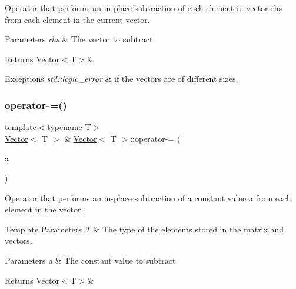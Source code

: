 Operator that performs an in-\/place subtraction of each element in vector {\ttfamily rhs} from each element in the current vector. 


\begin{DoxyParams}{Parameters}
{\em rhs} & The vector to subtract. \\
\hline
\end{DoxyParams}
\begin{DoxyReturn}{Returns}
Vector$<$\+T$>$\&
\end{DoxyReturn}

\begin{DoxyExceptions}{Exceptions}
{\em std\+::logic\+\_\+error} & if the vectors are of different sizes. \\
\hline
\end{DoxyExceptions}
\mbox{\label{classVector_a7581aba7a67b45ff1b2848d37e00cfa1}} 
\subsubsection{\texorpdfstring{operator-\/=()}{operator-=()}\hspace{0.1cm}{\footnotesize\ttfamily [2/2]}}
{\footnotesize\ttfamily template$<$typename T$>$ \\
\mbox{\hyperlink{classVector}{Vector}}$<$ T $>$ \& \mbox{\hyperlink{classVector}{Vector}}$<$ T $>$\+::operator-\/= (\begin{DoxyParamCaption}\item[{const T \&}]{a }\end{DoxyParamCaption})\hspace{0.3cm}{\ttfamily [inline]}}



Operator that performs an in-\/place subtraction of a constant value {\ttfamily a} from each element in the vector. 


\begin{DoxyTemplParams}{Template Parameters}
{\em T} & The type of the elements stored in the matrix and vectors. \\
\hline
\end{DoxyTemplParams}

\begin{DoxyParams}{Parameters}
{\em a} & The constant value to subtract. \\
\hline
\end{DoxyParams}
\begin{DoxyReturn}{Returns}
Vector$<$\+T$>$\& 
\end{DoxyReturn}
\mbox{\label{classVector_adbf519ce5d68eb131947137e30596dc1}} 
